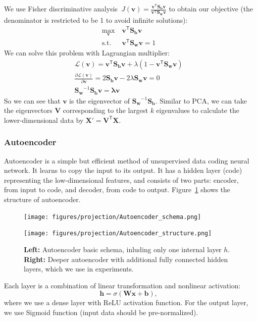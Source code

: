 \documentclass[journal]{IEEEtran}
\begin{document}
We use Fisher discriminative analysis $\ J(\mathbf v) = \mathbf{\frac{v^\mathsf{T} S_b v}{v^\mathsf{T} S_w v}}$ to obtain our objective (the denominator is restricted to be 1 to avoid infinite solutions):
\begin{align*}
\max_\mathbf{v} & \ \mathbf{v^\mathsf{T} S_b v}\\
\mathrm{s.t.} & \ \mathbf{v^\mathsf{T} S_w v}=1
\end{align*}
We can solve this problem with Lagrangian multiplier:
\begin{align*}
    \mathcal L(\mathbf v) = \mathbf{v^\mathsf{T} S_b v}+\lambda(1-\mathbf{v^\mathsf{T} S_w v}) \\
    \frac{\partial \mathcal L(\mathbf v)}{\partial \mathbf v} = 2 \mathbf{S_b v}-2\lambda \mathbf{S_w v}=0 \\
    \mathbf{S_w}^{-1}\mathbf{S_b v}=\mathbf{\lambda v}
\end{align*}
So we can see that $\mathbf v$ is the eigenvector of $\mathbf {S_w}^{-1}\mathbf{S_b}$. Similar to PCA, we can take the eigenvectors $\mathbf V$ corresponding to the largest $k$ eigenvalues to calculate the lower-dimensional data by $\mathbf {X'}=\mathbf {V^\mathsf{T} X}$.

\subsubsection{Autoencoder}
Autoencoder is a simple but efficient method of unsupervised data coding neural network. It learns to copy the input to its output. It has a hidden layer (code) representing the low-dimensional features, and consists of two parts: encoder, from input to code, and decoder, from code to output. Figure~\ref{fig:4} shows the structure of autoencoder.
\begin{figure}[ht]
\centering
\begin{minipage}[ht]{0.38\linewidth}
\centering
\texttt{[image: figures/projection/Autoencoder\_schema.png]}
\end{minipage}
\begin{minipage}[ht]{0.5\linewidth}
\centering
\texttt{[image: figures/projection/Autoencoder\_structure.png]}
\end{minipage}
\caption{\textbf{Left:} Autoencoder basic schema, inluding only one internal layer $h$. \textbf{Right:} Deeper autoencoder with additional fully connected hidden layers, which we use in experiments.}
\label{fig:4}
\end{figure}

Each layer is a combination of linear transformation and nonlinear activation:
$$
\mathbf h = \sigma(\mathbf {Wx+b}),
$$
where we use a dense layer with ReLU activation function. For the output layer, we use Sigmoid function (input data should be pre-normalized).
\end{document}
